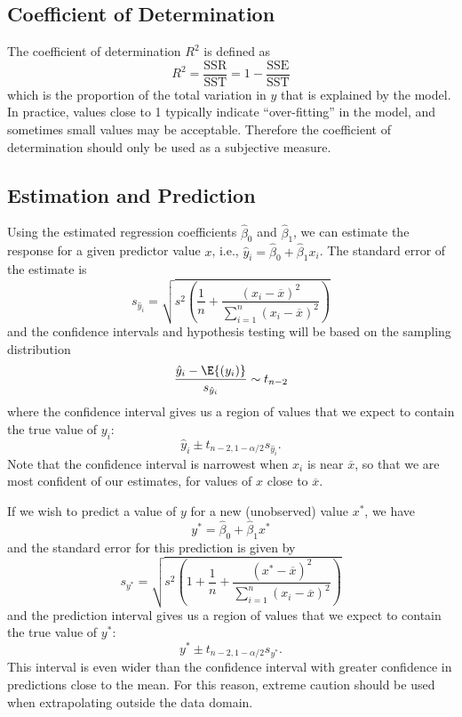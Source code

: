 \documentclass{article}
\begin{document}
\subsection{Coefficient of Determination}
The coefficient of determination \(R^2\) is defined as
\begin{equation*}
    R^2 = \frac{\mathrm{SSR}}{\mathrm{SST}} = 1 - \frac{\mathrm{SSE}}{\mathrm{SST}}
\end{equation*}
which is the proportion of the total variation in \(y\) that is explained by the model.
In practice, values close to 1 typically indicate ``over-fitting'' in the model, and sometimes small values
may be acceptable. Therefore the coefficient of determination should only be used as a subjective measure.
\subsection{Estimation and Prediction}
Using the estimated regression coefficients \(\hat{\beta}_0\) and \(\hat{\beta}_1\), we can estimate the response
for a given predictor value \(x\), i.e., \(\hat{y}_i = \hat{\beta}_0 + \hat{\beta}_1 x_i\).
The standard error of the estimate is
\begin{equation*}
    s_{\hat{y}_i} = \sqrt{s^2 \left( \frac{1}{n} + \frac{\left( x_i - \overline{x} \right)^2}{\sum_{i = 1}^n \left( x_i - \overline{x} \right)^2} \right)}
\end{equation*}
and the confidence intervals and hypothesis testing will be based on the sampling distribution
\begin{equation*}
    \frac{\hat{y}_i - \E{\left( y_i \right)}}{s_{\hat{y}_i}} \sim t_{n - 2}
\end{equation*}
where the confidence interval gives us a region of values that we expect to contain the true value of \(y_i\):
\begin{equation*}
    \hat{y}_i \pm t_{n - 2, 1 - \alpha / 2} s_{\hat{y}_i}.
\end{equation*}
Note that the confidence interval is narrowest when \(x_i\) is near \(\overline{x}\), so that we are most confident
of our estimates, for values of \(x\) close to \(\overline{x}\).

If we wish to predict a value of \(y\) for a new (unobserved) value \(x^\ast\), we have
\begin{equation*}
    y^\ast = \hat{\beta}_0 + \hat{\beta}_1 x^\ast
\end{equation*}
and the standard error for this prediction is given by
\begin{equation*}
    s_{y^\ast} = \sqrt{s^2 \left( 1 + \frac{1}{n} + \frac{\left( x^\ast - \overline{x} \right)^2}{\sum_{i = 1}^n \left( x_i - \overline{x} \right)^2} \right)}
\end{equation*}
and the prediction interval gives us a region of values that we expect to contain the true value of \(y^\ast\):
\begin{equation*}
    y^\ast \pm t_{n - 2, 1 - \alpha / 2} s_{y^\ast}.
\end{equation*}
This interval is even wider than the confidence interval with greater confidence in predictions close to the mean.
For this reason, extreme caution should be used when extrapolating outside the data domain.
\end{document}
